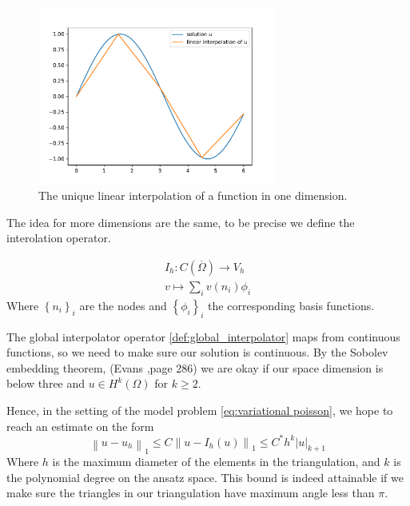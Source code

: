 \documentclass[../Main/main.tex]{subfiles}
\begin{document}
	\begin{figure}[H]
		\centering
		\includegraphics[width=0.7\textwidth]{interpolation.pdf}
		\caption{The unique linear interpolation of a function in one dimension.}
		\label{fig:1dinterpolation}
	\end{figure}
	The idea for more dimensions are the same, to be precise we define the interolation operator.
	\begin{definition}		\label{def:global_interpolator}
		\begin{gather*}
			I_h:C(\overline{\Omega}) \rightarrow V_h \\
			v \mapsto \sum_{i}v(n_i) \phi_i
		\end{gather*} 
	Where $\left\{ n_i\right \}_i$ are the nodes and $\left\{ \phi_i\right \}_i$ the corresponding basis functions.

	\end{definition}
	\begin{remark}
		The global interpolator operator \ref{def:global_interpolator} maps from continuous functions, so we need to make sure our solution is continuous. By the Sobolev embedding theorem, (Evans \cite{evans10},page 286) we are okay if our space dimension is below three and $u \in H^k(\Omega)$ for $k\geq 2$.
	\end{remark}
	Hence, in the setting of the model problem \eqref{eq:variational poisson}, we hope to reach an estimate on the form
	\begin{equation}\label{eq:energy norm estimate}
		\left \| u-u_h \right \|_{1} \leq C \left \| u-I_h(u) \right \|_{1}\leq C^* h^{k}|u|_{k+1}
	\end{equation}
	Where $h$ is the maximum diameter of the elements in the triangulation, and $k$ is the polynomial degree on the ansatz space.
	This bound is indeed attainable if we make sure the triangles in our triangulation have maximum angle less than $\pi$.
\end{document}
